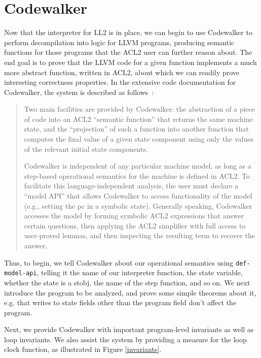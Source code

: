 \documentclass{eptcs}
\begin{document}
\section{Codewalker}

Now that the interpreter for LL2 is in place, we can begin to use
Codewalker to perform decompilation into logic for LLVM programs, 
producing semantic functions for those programs that 
the ACL2 user can further reason about.  The end goal is to prove that
the LLVM code for a given function implements a much more abstract
function, written in ACL2, about which we can readily prove interesting
correctness properties.  In the extensive code
documentation for Codewalker, the system is described as follows~\cite{Codewalker}:

\begin{quote}
Two main facilities are provided by Codewalker: the abstraction of a piece of
code into an ACL2 ``semantic function'' that returns the same machine state,
and the ``projection'' of such a function into another function that computes
the final value of a given state component using only the values of the
relevant initial state components.

Codewalker is independent of any particular machine model, as long as a
step-based operational semantics for the machine is defined in ACL2.  To
facilitate this language-independent analysis, the user must declare a
``model API'' that allows Codewalker to access functionality of the model
(e.g., setting the pc in a symbolic state).  Generally speaking, Codewalker
accesses the model by forming symbolic ACL2 expressions that answer certain
questions, then applying the ACL2 simplifier with full access to user-proved
lemmas, and then inspecting the resulting term to recover the answer.
\end{quote}

Thus, to begin, we tell Codewalker about our operational semantics 
using \texttt{def-model-api}, telling it the name of our interpreter
function, the state variable, whether the state is a stobj, the name
of the step function, and so on.  We next introduce the program to 
be analyzed, and prove some simple theorems 
about it, e.g. that writes to state fields other than the 
program field don't affect the program.

Next, we provide Codewalker with important program-level invariants as 
well as loop invariants.  We also assist the system by providing a
measure for the loop clock function, as illustrated in Figure \ref{invariants}.
\end{document}
